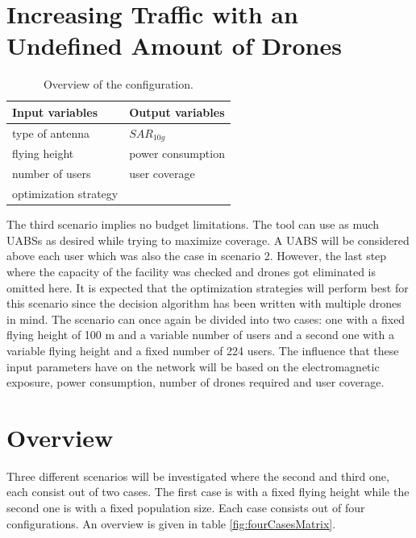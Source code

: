 \section{Increasing Traffic with an Undefined Amount of Drones}
\begin{table}[!htb]
      \centering
            \begin{tabular}{|l|l|}
            \hline
            \textbf{Input variables  }              & \textbf{Output variables}          \\   \hline 
            type of antenna                & $SAR_{10g}$               \\ 
            flying height                   & power consumption             \\ 
            number of users                & user coverage            \\ 
            optimization strategy           & \\
            \hline
            \end{tabular}
        \caption{Overview of the configuration.}
        \label{table:confOverviewScenario2}
\end{table}

The third scenario implies no budget limitations. The tool can use as much \gls{UABS}s as desired while trying to maximize coverage. 
A \gls{UABS} will be considered above each user which was also the case in scenario 2. However, the last step where the capacity of the facility
was checked and drones got eliminated is omitted here. It is expected that the optimization strategies will perform best for this scenario since the decision algorithm has been written
 with multiple drones in mind.
The scenario can once again be divided into two cases: one with a fixed flying height of 100 m and a variable number of users and a second one with 
a variable flying height and a fixed number of 224 users.
The influence that these input parameters have on the network will be based on the electromagnetic exposure, power consumption, number of drones required and user coverage.

\section{Overview}
Three different scenarios will be investigated where the second and third one, each consist out of two cases. The first case is with a fixed flying height while 
the second one is with a fixed population size. Each case consists out of four configurations. An overview is given in table \ref{fig:fourCasesMatrix}.

